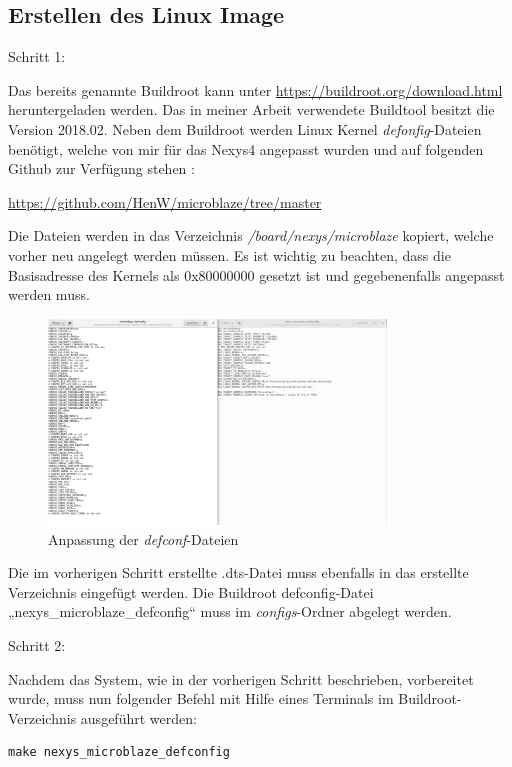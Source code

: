 \subsection{Erstellen des Linux Image}\label{kap:microblazelinux}



Schritt 1:

Das bereits genannte Buildroot kann unter \url{https://buildroot.org/download.html} heruntergeladen werden.
Das in meiner Arbeit verwendete Buildtool besitzt die Version 2018.02.
Neben dem Buildroot werden Linux Kernel \emph{defonfig}-Dateien benötigt, welche von mir für das Nexys4 angepasst wurden und auf folgenden Github zur Verfügung stehen :

\url{https://github.com/HenW/microblaze/tree/master}

Die Dateien werden in das Verzeichnis \emph{/board/nexys/microblaze} kopiert, welche vorher neu angelegt werden müssen.
 Es ist wichtig zu beachten, dass die Basisadresse des Kernels als 0x80000000 gesetzt ist und gegebenenfalls angepasst werden muss.


\begin{figure}[H]
\centering
\includegraphics[width=0.8\textwidth]{Hauptteil/Schritt16.png}
\caption{Anpassung der \emph{defconf}-Dateien}\label{fig:mbschritt16}
\end{figure}

Die im vorherigen Schritt erstellte .dts-Datei muss ebenfalls in das erstellte Verzeichnis eingefügt werden.
Die Buildroot defconfig-Datei „nexys\_microblaze\_defconfig“ muss im \emph{configs}-Ordner abgelegt werden.

Schritt 2:

Nachdem das System, wie in der vorherigen Schritt beschrieben,
vorbereitet wurde, muss nun folgender Befehl mit Hilfe eines Terminals im Buildroot-Verzeichnis ausgeführt werden:

\begin{lstlisting}[caption={Generierung der \emph{defconf}-Datei},label={code:mbdefconf}]
  make nexys_microblaze_defconfig
 \end{lstlisting}


